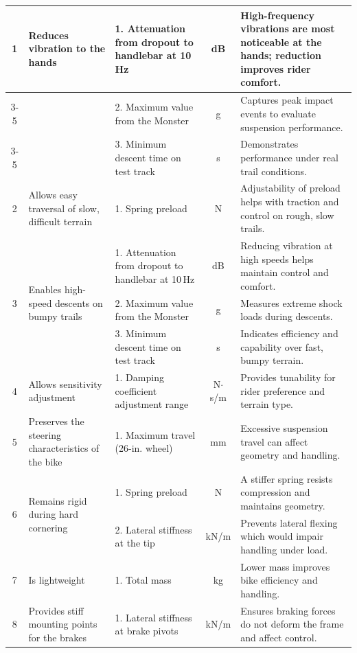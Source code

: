 \begin{landscape}
\begin{footnotesize}
\begin{longtable}{|c|p{4cm}|p{5cm}|c|p{6.5cm}|}
\multirow{3}{*}{1} 
  & \multirow{3}{4.5cm}{Reduces vibration to the hands} 
    & 1. Attenuation from dropout to handlebar at 10\,Hz & dB & High-frequency vibrations are most noticeable at the hands; reduction improves rider comfort. \\
\cline{3-5}
  & & 2. Maximum value from the Monster & g & Captures peak impact events to evaluate suspension performance. \\
\cline{3-5}
  & & 3. Minimum descent time on test track & s & Demonstrates performance under real trail conditions. \\
\hline
2 & Allows easy traversal of slow, difficult terrain 
  & 1. Spring preload & N & Adjustability of preload helps with traction and control on rough, slow trails. \\
\hline
\multirow{3}{*}{3} 
  & \multirow{3}{4.5cm}{Enables high-speed descents on bumpy trails} 
    & 1. Attenuation from dropout to handlebar at 10\,Hz & dB & Reducing vibration at high speeds helps maintain control and comfort. \\
\cline{3-5}
  & & 2. Maximum value from the Monster & g & Measures extreme shock loads during descents. \\
\cline{3-5}
  & & 3. Minimum descent time on test track & s & Indicates efficiency and capability over fast, bumpy terrain. \\
\hline
4 & Allows sensitivity adjustment 
  & 1. Damping coefficient adjustment range & N$\cdot$s/m & Provides tunability for rider preference and terrain type. \\
\hline
5 & Preserves the steering characteristics of the bike 
  & 1. Maximum travel (26-in. wheel) & mm & Excessive suspension travel can affect geometry and handling. \\
\hline
\multirow{2}{*}{6} 
  & \multirow{2}{4.5cm}{Remains rigid during hard cornering} 
    & 1. Spring preload & N & A stiffer spring resists compression and maintains geometry. \\
\cline{3-5}
  & & 2. Lateral stiffness at the tip & kN/m & Prevents lateral flexing which would impair handling under load. \\
\hline
7 & Is lightweight 
  & 1. Total mass & kg & Lower mass improves bike efficiency and handling. \\
\hline
8 & Provides stiff mounting points for the brakes 
  & 1. Lateral stiffness at brake pivots & kN/m & Ensures braking forces do not deform the frame and affect control. \\
\hline

\end{longtable}
\end{footnotesize}
\end{landscape}